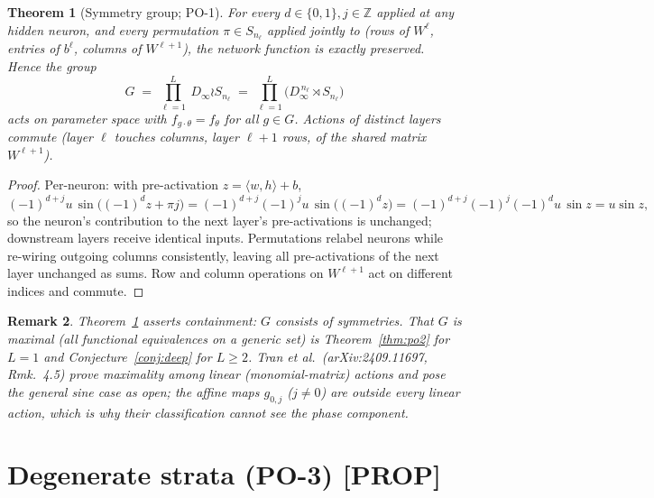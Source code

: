 \documentclass[11pt]{article}
\newtheorem{theorem}{Theorem}[section]
\newtheorem{remark}[theorem]{Remark}
\newcommand{\Z}{\mathbb{Z}}
\newcommand{\Dinf}{D_\infty}
\begin{document}
\begin{theorem}[Symmetry group; PO-1]\label{thm:po1}
For every $d\in\{0,1\}, j\in\Z$ applied at any hidden neuron, and every permutation
$\pi\in S_{n_\ell}$ applied jointly to (rows of $W^\ell$, entries of $b^\ell$, columns of
$W^{\ell+1}$), the network function is exactly preserved. Hence the group
\[
G \;=\; \prod_{\ell=1}^{L}\ \Dinf \wr S_{n_\ell}
\;=\;\prod_{\ell=1}^{L}\big(\Dinf^{\,n_\ell}\rtimes S_{n_\ell}\big)
\]
acts on parameter space with $f_{g\cdot\theta}=f_\theta$ for all $g\in G$. Actions of distinct
layers commute (layer $\ell$ touches columns, layer $\ell+1$ rows, of the shared matrix
$W^{\ell+1}$).
\end{theorem}

\begin{proof}
Per-neuron: with pre-activation $z=\langle w,h\rangle+b$,
\[
(-1)^{d+j}u\,\sin\!\big((-1)^d z+\pi j\big)
=(-1)^{d+j}(-1)^{j}u\,\sin\!\big((-1)^d z\big)
=(-1)^{d+j}(-1)^{j}(-1)^{d}u\,\sin z = u\sin z ,
\]
so the neuron's contribution to the next layer's pre-activations is unchanged; downstream layers
receive identical inputs. Permutations relabel neurons while re-wiring outgoing columns
consistently, leaving all pre-activations of the next layer unchanged as sums. Row and column
operations on $W^{\ell+1}$ act on different indices and commute. \qedhere
\end{proof}

\begin{remark}
Theorem~\ref{thm:po1} asserts \emph{containment}: $G$ consists of symmetries. That $G$ is
\emph{maximal} (all functional equivalences on a generic set) is Theorem~\ref{thm:po2} for $L=1$
and Conjecture~\ref{conj:deep} for $L\ge 2$. Tran et al.\ (arXiv:2409.11697, Rmk.~4.5) prove
maximality among \emph{linear} (monomial-matrix) actions and pose the general sine case as open;
the affine maps $g_{0,j}$ ($j\neq0$) are outside every linear action, which is why their
classification cannot see the phase component.
\end{remark}

\section{Degenerate strata (PO-3) [PROP]}
\end{document}
